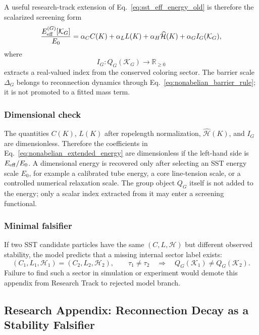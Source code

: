 A useful research-track extension of Eq.~\eqref{eq:sst_eff_energy_old} is therefore the scalarized screening form
\begin{equation}
    \frac{E_{\rm eff}^{(G)}[\mathcal K_G]}{E_0}
    =\alpha_C C(K)+\alpha_L L(K)+\alpha_H\widehat{\mathcal H}(K)
    +\alpha_G I_G(\mathcal K_G),
    \label{eq:nonabelian_extended_energy}
\end{equation}
where
\begin{equation}
    I_G:Q_G(\mathcal K_G)\longrightarrow \mathbb R_{\ge 0}
\end{equation}
extracts a real-valued index from the conserved coloring sector.  The barrier scale $\Delta_G$ belongs to reconnection dynamics through Eq.~\eqref{eq:nonabelian_barrier_rule}; it is not promoted to a fitted mass term.

\subsubsection{Dimensional check}
The quantities $C(K)$, $L(K)$ after ropelength normalization, $\widehat{\mathcal H}(K)$, and $I_G$ are dimensionless.  Therefore the coefficients in Eq.~\eqref{eq:nonabelian_extended_energy} are dimensionless if the left-hand side is $E_{\rm eff}/E_0$.  A dimensional energy is recovered only after selecting an SST energy scale $E_0$, for example a calibrated tube energy, a core line-tension scale, or a controlled numerical relaxation scale.  The group object $Q_G$ itself is not added to the energy; only a scalar index extracted from it may enter a screening functional.

\subsubsection{Minimal falsifier}
If two SST candidate particles have the same $(C,L,\mathcal H)$ but different observed stability, the model predicts that a missing internal sector label exists:
\begin{equation}
    (C_1,L_1,\mathcal H_1)=(C_2,L_2,\mathcal H_2),
    \qquad
    \tau_1\neq \tau_2
    \quad\Rightarrow\quad
    Q_G(\mathcal K_1)\neq Q_G(\mathcal K_2).
\end{equation}
Failure to find such a sector in simulation or experiment would demote this appendix from Research Track to rejected model branch.

\subsection{Research Appendix: Reconnection Decay as a Stability Falsifier}
\label{app:reconnection_decay_falsifier}

